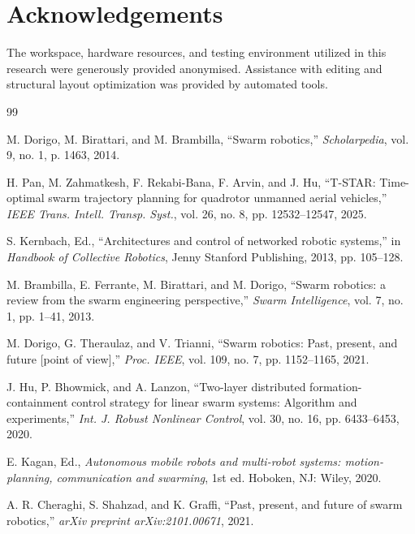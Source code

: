 \documentclass[letterpaper, 10pt, conference]{IEEEtran}
\begin{document}
\section*{Acknowledgements}
The workspace, hardware resources, and testing environment utilized in this research were generously provided anonymised. Assistance with editing and structural layout optimization was provided by automated tools.

\begin{thebibliography}{99}

M. Dorigo, M. Birattari, and M. Brambilla, ``Swarm robotics,'' \emph{Scholarpedia}, vol. 9, no. 1, p. 1463, 2014.

H. Pan, M. Zahmatkesh, F. Rekabi-Bana, F. Arvin, and J. Hu, ``T-STAR: Time-optimal swarm trajectory planning for quadrotor unmanned aerial vehicles,'' \emph{IEEE Trans. Intell. Transp. Syst.}, vol. 26, no. 8, pp. 12532--12547, 2025.

S. Kernbach, Ed., ``Architectures and control of networked robotic systems,'' in \emph{Handbook of Collective Robotics}, Jenny Stanford Publishing, 2013, pp. 105--128.

M. Brambilla, E. Ferrante, M. Birattari, and M. Dorigo, ``Swarm robotics: a review from the swarm engineering perspective,'' \emph{Swarm Intelligence}, vol. 7, no. 1, pp. 1--41, 2013.

M. Dorigo, G. Theraulaz, and V. Trianni, ``Swarm robotics: Past, present, and future [point of view],'' \emph{Proc. IEEE}, vol. 109, no. 7, pp. 1152--1165, 2021.

J. Hu, P. Bhowmick, and A. Lanzon, ``Two-layer distributed formation-containment control strategy for linear swarm systems: Algorithm and experiments,'' \emph{Int. J. Robust Nonlinear Control}, vol. 30, no. 16, pp. 6433--6453, 2020.

E. Kagan, Ed., \emph{Autonomous mobile robots and multi-robot systems: motion-planning, communication and swarming}, 1st ed. Hoboken, NJ: Wiley, 2020.

A. R. Cheraghi, S. Shahzad, and K. Graffi, ``Past, present, and future of swarm robotics,'' \emph{arXiv preprint arXiv:2101.00671}, 2021.


\end{thebibliography}
\end{document}

